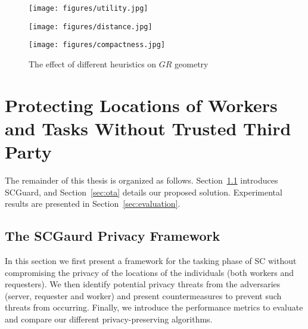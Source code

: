\documentclass{USC-Thesis}
\newcommand{\SCG}{{SCGuard}}
\numberwithin{equation}{chapter}
\begin{document}
\begin{figure}[!ht]
	\centering
	\begin{minipage}[b]{0.25\linewidth}
		\texttt{[image: figures/utility.jpg]}
		\label{fig:utility}
	\end{minipage}
	\hspace{0.5cm}
	\centering
	\begin{minipage}[b]{0.25\linewidth}
		\texttt{[image: figures/distance.jpg]}
		\label{fig:distance}
	\end{minipage}
	\hspace{0.5cm}
	\centering
	\begin{minipage}[b]{0.26\linewidth}
		\texttt{[image: figures/compactness.jpg]}
		\label{fig:compactness}
	\end{minipage}
	\caption{The effect of different heuristics on $\mathit{GR}$ geometry}	
\label{fig:heuristics}
\end{figure}

\section{Protecting Locations of Workers and Tasks Without Trusted Third Party}
The remainder of this thesis is organized as follows.
Section~\ref{sec:framework} introduces \SCG, and Section~\ref{sec:ota} details our proposed solution. Experimental results are presented in Section~\ref{sec:evaluation}.

\subsection{The SCGaurd Privacy Framework}
\label{sec:framework}
In this section we first present a framework for the tasking phase of SC without compromising the privacy of the locations of the individuals (both workers and requesters).
We then identify potential privacy threats from the adversaries (server, requester and worker) and present countermeasures to prevent such threats from occurring.
Finally, we introduce the performance metrics to evaluate and compare our different privacy-preserving algorithms.

\end{document}
